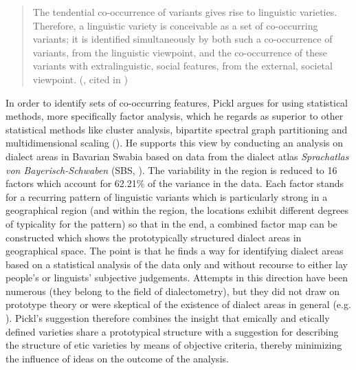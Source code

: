 \begin{quote}
The tendential co-occurrence of variants gives rise to linguistic varieties. Therefore, a linguistic variety is conceivable as a set of co-occurring variants; it is identified simultaneously by both such a co-occurrence of variants, from the linguistic viewpoint, and the co-occurrence of these variants with extralinguistic, social features, from the external, societal viewpoint. (\citealt[229]{Berruto2010}, cited in \citealt[79]{Pickl2016})
\end{quote}

In order to identify sets of co-occurring features, Pickl argues for using statistical methods, more specifically factor analysis, which he regards as superior to other statistical methods like cluster analysis, bipartite spectral graph partitioning and multidimensional scaling (\citeyear[80--83]{Pickl2016}). He supports this view by conducting an analysis on dialect areas in Bavarian Swabia based on data from the dialect atlas \emph{Sprachatlas von Bayerisch-Schwaben} (SBS, \citealt{Konig19962009}). The variability in the region is reduced to 16 factors which account for 62.21\% of the variance in the data. Each factor stands for a recurring pattern of linguistic variants which is particularly strong in a geographical region (and within the region, the locations exhibit different degrees of typicality for the pattern) so that in the end, a combined factor map can be constructed which shows the prototypically structured dialect areas in geographical space. The point is that he finds a way for identifying dialect areas based on a statistical analysis of the data only and without recourse to either lay people’s or linguists’ subjective judgements. Attempts in this direction have been numerous (they belong to the field of dialectometry), but they did not draw on prototype theory or were skeptical of the existence of dialect areas in general (e.g. \citealt{Kretzschmar1996}). Pickl’s suggestion therefore combines the insight that emically and etically defined varieties share a prototypical structure with a suggestion for describing the structure of etic varieties by means of objective criteria, thereby minimizing the influence of ideas on the outcome of the analysis.

